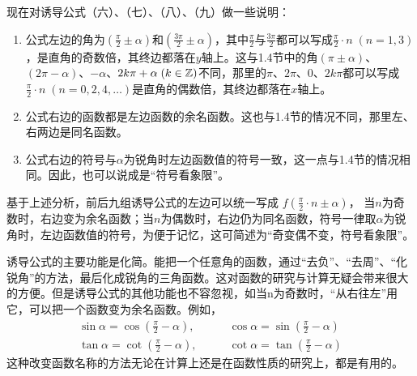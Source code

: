 现在对诱导公式（六）、（七）、（八）、（九）做一些说明：
\begin{enumerate}
\item 公式左边的角为$\left(\frac{\pi}{2}\pm \alpha\right)$和$\left(\frac{3\pi}{2}\pm \alpha\right)$，其中$\frac{\pi}{2}$与$\frac{3\pi}{2}$都可以写成$\frac{\pi}{2}\cdot n\; (n=1,3)$，是直角的奇数倍，其终边都落在$y$轴上。这与1.4节中的角$(\pi\pm\alpha)$、$(2\pi-\alpha)$、$-\alpha$、$2k\pi+\alpha\; (k\in\mathbb{Z})$不同，那里的$\pi$、$2\pi$、0、$2k\pi$都可以写成$\frac{\pi}{2}\cdot n\; (n=0,2,4,\ldots)$是直角的偶数倍，其终边都落在$x$轴上。
\item 公式右边的函数都是左边函数的余名函数。这也与1.4节的情况不同，那里左、右两边是同名函数。
\item 公式右边的符号与$\alpha$为锐角时左边函数值的符号一致，这一点与1.4节的情况相同。因此，也可以说成是“符号看象限”。
\end{enumerate}

基于上述分析，前后九组诱导公式的左边可以统一写成
$f\left(\frac{\pi}{2}\cdot n\pm \alpha\right)$，
当$n$为奇数时，右边变为余名函数；当$n$为偶数时，右边仍为同名函数，符号一律取$\alpha$为锐角时，左边函数值的符号，为便于记忆，这可简述为“奇变偶不变，符号看象限”。

诱导公式的主要功能是化简。能把一个任意角的函数，通过“去负”、“去周”、“化锐角”的方法，最后化成锐角的三角函数。这对函数的研究与计算无疑会带来很大的方便。但是诱导公式的其他功能也不容忽视，如当n为奇数时，“从右往左”用它，可以把一个函数变为余名函数。例如，
\[\begin{split}
\sin\alpha=\cos\left(\frac{\pi}{2}-\alpha\right),&\qquad 
\cos\alpha=\sin\left(\frac{\pi}{2}-\alpha\right)\\
\tan\alpha=\cot\left(\frac{\pi}{2}-\alpha\right),&\qquad 
\cot\alpha=\tan\left(\frac{\pi}{2}-\alpha\right)
\end{split}\]
这种改变函数名称的方法无论在计算上还是在函数性质的研究上，都是有用的。


